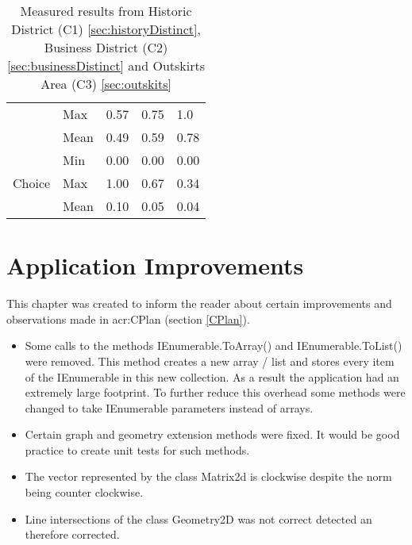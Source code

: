 \begin{table}[h]
\begin{center}
\begin{tabular}{ |l|l|l|l|l| }
            & Max & 0.57 & 0.75 & 1.0 \\
            & Mean & 0.49 & 0.59 & 0.78 \\
            \hline
            \multirow{5}{*}{Choice}
            & Min & 0.00 & 0.00 & 0.00 \\
            & Max & 1.00 & 0.67 & 0.34 \\
            & Mean & 0.10 & 0.05 & 0.04 \\
            \hline
        \end{tabular}
        \caption{Measured results from Historic District (C1) \ref{sec:historyDistinct}, Business District (C2) \ref{sec:businessDistinct} and Outskirts Area (C3) \ref{sec:outskits}}
    \end{center}
\end{table}

\pagebreak
\section{Application Improvements}
This chapter was created to inform the reader about certain improvements and observations made in \gls{acr:CPlan} (section \ref{CPlan}).
\begin{itemize}
    \item Some calls to the methods IEnumerable.ToArray() and IEnumerable.ToList() were removed. This method creates a new array / list and stores every item of the IEnumerable in this new collection. As a result the application had an extremely large footprint. To further reduce this overhead some methods were changed to take IEnumerable parameters instead of arrays.
    \item Certain graph and geometry extension methods were fixed. It would be good practice to create unit tests for such methods.
    \item The vector represented by the class Matrix2d is clockwise despite the norm being counter clockwise.
    \item Line intersections of the class Geometry2D was not correct detected an therefore corrected.
\end{itemize}
